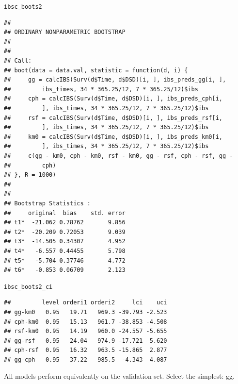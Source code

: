 \documentclass{article}\usepackage[]{graphicx}\usepackage[]{color}
\makeatletter
\newcommand{\hlstd}[1]{\textcolor[rgb]{0.345,0.345,0.345}{#1}}%
\newenvironment{kframe}{%
 \def\at@end@of@kframe{}%
 \ifinner\ifhmode%
  \def\at@end@of@kframe{\end{minipage}}%
  \begin{minipage}{\columnwidth}%
 \fi\fi%
 \def\FrameCommand##1{\hskip\@totalleftmargin \hskip-\fboxsep
 \colorbox{shadecolor}{##1}\hskip-\fboxsep
     \hskip-\linewidth \hskip-\@totalleftmargin \hskip\columnwidth}%
 \MakeFramed {\advance\hsize-\width
   \@totalleftmargin\z@ \linewidth\hsize
   \@setminipage}}%
 {\par\unskip\endMakeFramed%
 \at@end@of@kframe}
\newenvironment{knitrout}{}{} %
\makeatother
\begin{document}
\begin{knitrout}
\begin{kframe}
\begin{alltt}
\hlstd{ibsc_boots2}
\end{alltt}
\begin{verbatim}
## 
## ORDINARY NONPARAMETRIC BOOTSTRAP
## 
## 
## Call:
## boot(data = data.val, statistic = function(d, i) {
##     gg = calcIBS(Surv(d$Time, d$DSD)[i, ], ibs_preds_gg[i, ], 
##         ibs_times, 34 * 365.25/12, 7 * 365.25/12)$ibs
##     cph = calcIBS(Surv(d$Time, d$DSD)[i, ], ibs_preds_cph[i, 
##         ], ibs_times, 34 * 365.25/12, 7 * 365.25/12)$ibs
##     rsf = calcIBS(Surv(d$Time, d$DSD)[i, ], ibs_preds_rsf[i, 
##         ], ibs_times, 34 * 365.25/12, 7 * 365.25/12)$ibs
##     km0 = calcIBS(Surv(d$Time, d$DSD)[i, ], ibs_preds_km0[i, 
##         ], ibs_times, 34 * 365.25/12, 7 * 365.25/12)$ibs
##     c(gg - km0, cph - km0, rsf - km0, gg - rsf, cph - rsf, gg - 
##         cph)
## }, R = 1000)
## 
## 
## Bootstrap Statistics :
##     original  bias    std. error
## t1*  -21.062 0.78762       9.856
## t2*  -20.209 0.72053       9.039
## t3*  -14.505 0.34307       4.952
## t4*   -6.557 0.44455       5.798
## t5*   -5.704 0.37746       4.772
## t6*   -0.853 0.06709       2.123
\end{verbatim}
\begin{alltt}
\hlstd{ibsc_boots2_ci}
\end{alltt}
\begin{verbatim}
##         level orderi1 orderi2     lci    uci
## gg-km0   0.95   19.71   969.3 -39.793 -2.523
## cph-km0  0.95   15.13   961.7 -38.853 -4.508
## rsf-km0  0.95   14.19   960.0 -24.557 -5.655
## gg-rsf   0.95   24.04   974.9 -17.721  5.620
## cph-rsf  0.95   16.32   963.5 -15.865  2.877
## gg-cph   0.95   37.22   985.5  -4.343  4.087
\end{verbatim}
\end{kframe}
\end{knitrout}
All models perform equivalently on the validation set.  Select the simplest: gg.
\end{document}
